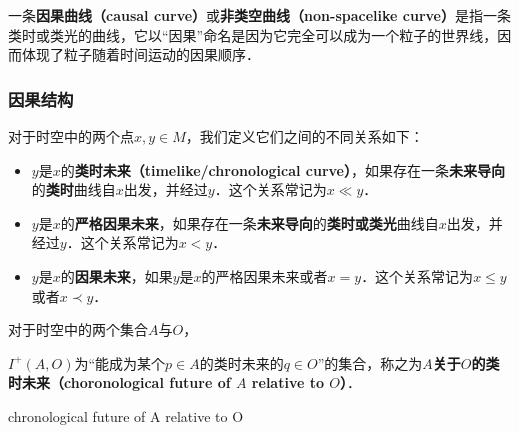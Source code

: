 一条\textbf{因果曲线（causal curve）}或\textbf{非类空曲线（non-spacelike curve）}是指一条类时或类光的曲线，它以“因果”命名是因为它完全可以成为一个粒子的世界线，因而体现了粒子随着时间运动的因果顺序．


\subsubsection{因果结构}

对于时空中的两个点$x, y\in M$，我们定义它们之间的不同关系如下：

\begin{itemize}
\item $y$是$x$的\textbf{类时未来（timelike/chronological curve）}，如果存在一条\textbf{未来导向}的\textbf{类时}曲线自$x$出发，并经过$y$．这个关系常记为$x\ll y$．
\item $y$是$x$的\textbf{严格因果未来}，如果存在一条\textbf{未来导向}的\textbf{类时或类光}曲线自$x$出发，并经过$y$．这个关系常记为$x< y$．
\item $y$是$x$的\textbf{因果未来}，如果$y$是$x$的严格因果未来或者$x=y$．这个关系常记为$x\leq y$或者$x\prec y$．
\end{itemize}

对于时空中的两个集合$A$与$O$，


\begin{\itemize}
$I^+(A, O)$为“能成为某个$p\in A$的类时未来的$q\in O$”的集合，称之为\textbf{$A$关于$O$的类时未来（choronological future of $A$ relative to $O$）}．

\end{\itemize}


 chronological future
of A relative to O




